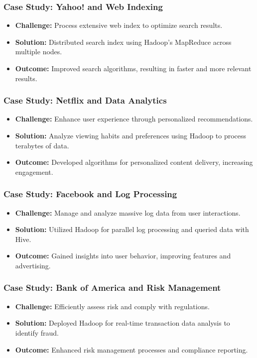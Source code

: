 \documentclass[aspectratio=169]{beamer}
\begin{document}
\begin{frame}
    \frametitle{Case Study: Yahoo! and Web Indexing}
    \begin{itemize}
        \item \textbf{Challenge:} Process extensive web index to optimize search results.
        \item \textbf{Solution:} Distributed search index using Hadoop's MapReduce across multiple nodes.
        \item \textbf{Outcome:} Improved search algorithms, resulting in faster and more relevant results.
    \end{itemize}
\end{frame}

\begin{frame}
    \frametitle{Case Study: Netflix and Data Analytics}
    \begin{itemize}
        \item \textbf{Challenge:} Enhance user experience through personalized recommendations.
        \item \textbf{Solution:} Analyze viewing habits and preferences using Hadoop to process terabytes of data.
        \item \textbf{Outcome:} Developed algorithms for personalized content delivery, increasing engagement.
    \end{itemize}
\end{frame}

\begin{frame}
    \frametitle{Case Study: Facebook and Log Processing}
    \begin{itemize}
        \item \textbf{Challenge:} Manage and analyze massive log data from user interactions.
        \item \textbf{Solution:} Utilized Hadoop for parallel log processing and queried data with Hive.
        \item \textbf{Outcome:} Gained insights into user behavior, improving features and advertising.
    \end{itemize}
\end{frame}

\begin{frame}
    \frametitle{Case Study: Bank of America and Risk Management}
    \begin{itemize}
        \item \textbf{Challenge:} Efficiently assess risk and comply with regulations.
        \item \textbf{Solution:} Deployed Hadoop for real-time transaction data analysis to identify fraud.
        \item \textbf{Outcome:} Enhanced risk management processes and compliance reporting.
    \end{itemize}
\end{frame}
\end{document}
